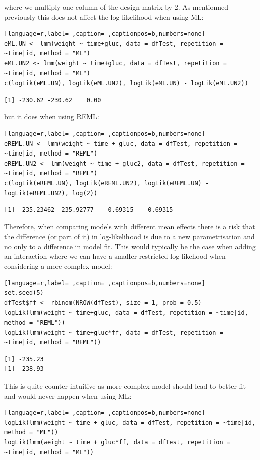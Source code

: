 \documentclass[12pt]{article}
\begin{document}
\noindent where we multiply one column of the design matrix by 2. As mentionned
previously this does not affect the log-likelihood when using ML:
\begin{lstlisting}[language=r,label= ,caption= ,captionpos=b,numbers=none]
eML.UN <- lmm(weight ~ time+gluc, data = dfTest, repetition = ~time|id, method = "ML")
eML.UN2 <- lmm(weight ~ time+gluc, data = dfTest, repetition = ~time|id, method = "ML")
c(logLik(eML.UN), logLik(eML.UN2), logLik(eML.UN) - logLik(eML.UN2))
\end{lstlisting}

\begin{verbatim}
[1] -230.62 -230.62    0.00
\end{verbatim}


but it does when using REML:
\begin{lstlisting}[language=r,label= ,caption= ,captionpos=b,numbers=none]
eREML.UN <- lmm(weight ~ time + gluc, data = dfTest, repetition = ~time|id, method = "REML")
eREML.UN2 <- lmm(weight ~ time + gluc2, data = dfTest, repetition = ~time|id, method = "REML")
c(logLik(eREML.UN), logLik(eREML.UN2), logLik(eREML.UN) - logLik(eREML.UN2), log(2))
\end{lstlisting}

\begin{verbatim}
[1] -235.23462 -235.92777    0.69315    0.69315
\end{verbatim}



Therefore, when comparing models with different mean effects there is
a risk that the difference (or part of it) in log-likelihood is due to
a new parametrisation and no only to a difference in model fit. This
would typically be the case when adding an interaction where we can
have a smaller restricted log-likehood when considering a more complex
model:

\begin{lstlisting}[language=r,label= ,caption= ,captionpos=b,numbers=none]
set.seed(5) 
dfTest$ff <- rbinom(NROW(dfTest), size = 1, prob = 0.5)
logLik(lmm(weight ~ time+gluc, data = dfTest, repetition = ~time|id, method = "REML"))
logLik(lmm(weight ~ time+gluc*ff, data = dfTest, repetition = ~time|id, method = "REML"))
\end{lstlisting}

\begin{verbatim}
[1] -235.23
[1] -238.93
\end{verbatim}


This is quite counter-intuitive as more complex model should lead to
better fit and would never happen when using ML:
\begin{lstlisting}[language=r,label= ,caption= ,captionpos=b,numbers=none]
logLik(lmm(weight ~ time + gluc, data = dfTest, repetition = ~time|id, method = "ML"))
logLik(lmm(weight ~ time + gluc*ff, data = dfTest, repetition = ~time|id, method = "ML"))
\end{lstlisting}
\end{document}
